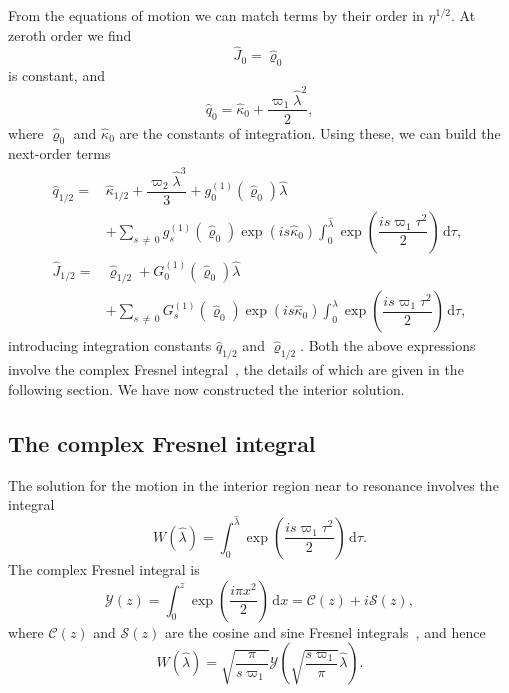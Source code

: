 \documentclass[aps,prd,amsfonts,amssymb,amsmath,nofootinbib,showpacs,superscriptaddress,twocolumn,floatfix]{revtex4-1}
\newcommand{\dd}{\ensuremath{\mathrm{d}}}
\newcommand{\intd}[4]{\ensuremath{\int_{#1}^{#2}{#3}\,\dd{#4}}}
\begin{document}
From the equations of motion we can match terms by their order in $\eta^{1/2}$. At zeroth order we find
\begin{equation}
\widehat{J}_0 = \widehat{\varrho}_0
\end{equation}
is constant, and
\begin{equation}
\widehat{q}_0 = \widehat{\kappa}_0 + \dfrac{\varpi_1\widehat{\lambda}^2}{2},
\end{equation}
where $\widehat{\varrho}_0$ and $\widehat{\kappa}_0$ are the constants of integration. Using these, we can build the next-order terms
\begin{align}
\widehat{q}_{1/2} = {} & \widehat{\kappa}_{1/2} + \dfrac{\varpi_2\widehat{\lambda}^3}{3} + g_0^{(1)}(\widehat{\varrho}_0)\widehat{\lambda} \nonumber \\ 
 {} & + \sum_{s\,\neq\,0}g_s^{(1)}(\widehat{\varrho}_0)\exp(is \widehat{\kappa}_0)\intd{0}{\hat{\lambda}}{\exp\left(\dfrac{is \varpi_1\tau^2}{2}\right)}{\tau}, \\
\widehat{J}_{1/2} = {} & \widehat{\varrho}_{1/2} + G_0^{(1)}(\widehat{\varrho}_0)\widehat{\lambda} \nonumber \\
 {} & + \sum_{s\,\neq\,0}G_s^{(1)}(\widehat{\varrho}_0)\exp(is \widehat{\kappa}_0)\intd{0}{\hat{\lambda}}{\exp\left(\dfrac{is \varpi_1\tau^2}{2}\right)}{\tau},
\end{align}
introducing integration constants $\widehat{q}_{1/2}$ and $\widehat{\varrho}_{1/2}$. Both the above expressions involve the complex Fresnel integral~\cite{Olver2010}, the details of which are given in the following section. We have now constructed the interior solution. %

\subsection{The complex Fresnel integral}

The solution for the motion in the interior region near to resonance involves the integral
\begin{equation}
W\left(\widehat{\lambda}\right) = \intd{0}{\hat{\lambda}}{\exp\left(\dfrac{is \varpi_1\tau^2}{2}\right)}{\tau}.
\end{equation}
The complex Fresnel integral is
\begin{equation}
\mathcal{Y}(z) = \intd{0}{z}{\exp\left(\dfrac{i\pi x^2}{2}\right)}{x} = \mathcal{C}(z) + i\mathcal{S}(z),
\end{equation}
where $\mathcal{C}(z)$ and $\mathcal{S}(z)$ are the cosine and sine Fresnel integrals~\cite{Olver2010}, and hence %
\begin{equation}
W\left(\widehat{\lambda}\right) = \sqrt{\dfrac{\pi}{s\varpi_1}}\mathcal{Y}\left(\sqrt{\dfrac{s\varpi_1}{\pi}}\widehat{\lambda}\right).
\end{equation}
\end{document}
